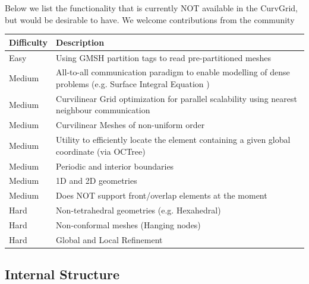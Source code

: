 \noindent
Below we list the functionality that is currently NOT available in the CurvGrid, but would be desirable to have. We welcome contributions from the community \\

\noindent
\begin{tabularx}{\textwidth}{l X}
\hline
     Difficulty & Description \\
\hline
	 Easy & Using GMSH partition tags to read pre-partitioned meshes \\
	 Medium & All-to-all communication paradigm to enable modelling of dense problems (e.g. Surface Integral Equation \cite{kern+2009}) \\
	 Medium & Curvilinear Grid optimization for parallel scalability using nearest neighbour communication \\
	 Medium & Curvilinear Meshes of non-uniform order \\
	 Medium & Utility to efficiently locate the element containing a given global coordinate (via OCTree) \\
	 Medium & Periodic and interior boundaries \\
	 Medium & 1D and 2D geometries \\
	 Medium & Does NOT support front/overlap elements at the moment \\
	 Hard & Non-tetrahedral geometries (e.g. Hexahedral) \\
	 Hard & Non-conformal meshes (Hanging nodes) \\
	 Hard & Global and Local Refinement \\
\hline
\end{tabularx}



\subsection{Internal Structure}
\label{section-outline-internalstructure}

